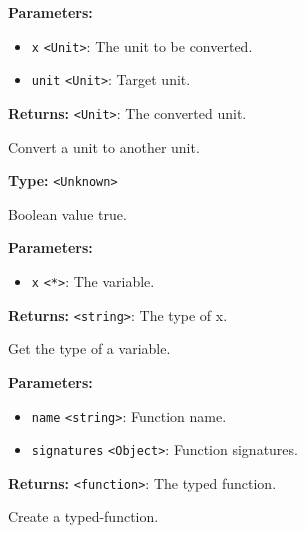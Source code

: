 \documentclass[12pt,a4paper]{article}
\begin{document}
\noindent \textbf{Parameters:}
\begin{itemize}
  \item \texttt{x} \texttt{<Unit>}: The unit to be converted.
  \item \texttt{unit} \texttt{<Unit>}: Target unit.
\end{itemize}

\noindent \textbf{Returns:} \texttt{<Unit>}: The converted unit.

\noindent Convert a unit to another unit.

\vspace{5mm}
\noindent {}\vspace{4mm}


\noindent \textbf{Type:} \texttt{<Unknown>}

\noindent Boolean value true.

\vspace{5mm}
\noindent {}


\noindent \textbf{Parameters:}
\begin{itemize}
  \item \texttt{x} \texttt{<*>}: The variable.
\end{itemize}

\noindent \textbf{Returns:} \texttt{<string>}: The type of x.

\noindent Get the type of a variable.

\vspace{5mm}
\noindent {}


\noindent \textbf{Parameters:}
\begin{itemize}
  \item \texttt{name} \texttt{<string>}: Function name.
  \item \texttt{signatures} \texttt{<Object>}: Function signatures.
\end{itemize}

\noindent \textbf{Returns:} \texttt{<function>}: The typed function.

\noindent Create a typed-function.

\vspace{5mm}
\noindent {}
\end{document}

